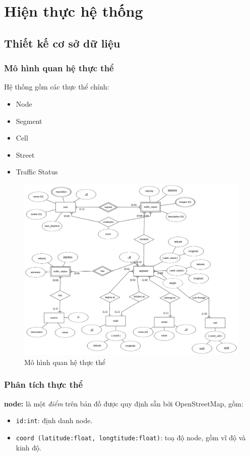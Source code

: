 
\chapter{Hiện thực hệ thống} %

\label{Chapter4}

\section{Thiết kế cơ sở dữ liệu}
\subsection{Mô hình quan hệ thực thể}
Hệ thống gồm các thực thể chính:
\begin{itemize}
    \item Node
    \item Segment
    \item Cell
    \item Street
    \item Traffic Status
\end{itemize}
\begin{figure}[H]
\centering
\includegraphics[width=1.0\textwidth]{Traffic_Report/images/erd.png}
\caption{Mô hình quan hệ thực thể}\label{}
\end{figure}

\subsection{Phân tích thực thể}
\textbf{node:} là một \textit{điểm} trên bản đồ được quy định sẵn bởi OpenStreetMap, gồm:
\begin{itemize}
    \item \lstinline{id:int}: định danh node.
    \item \lstinline{coord (latitude:float, longtitude:float)}: toạ độ node, gồm vĩ độ và kinh độ.\\
\end{itemize}

